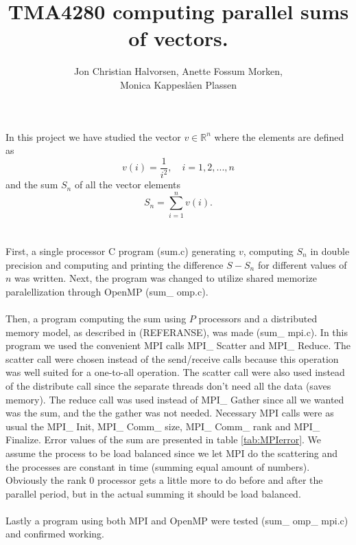 \documentclass{article}
\title{TMA4280 computing parallel sums of vectors.}
\author{Jon Christian Halvorsen, Anette Fossum Morken, \\Monica Kappeslåen Plassen}
\begin{document}
\maketitle
In this project we have studied the vector $v \in \mathbb{R}^n$ where the elements are defined as 
\begin{equation}
\label{vdefinition}
	v(i) =\frac{1}{i^2},\quad i = 1,2,...,n
\end{equation}
and the sum $S_n$ of all the vector elements 
\begin{equation}
\label{Sdefinition}
	S_n = \sum_{i=1}^n v(i).
\end{equation}\\
\\
First, a single processor C program (sum.c) generating $v$, computing $S_n$ in double precision and computing and printing the difference $S - S_n$ for different values of $n$ was written. Next, the program was changed to utilize shared memorize paralellization through OpenMP (sum\_ omp.c). \\
\\
Then, a program computing the sum using $P$ processors and a distributed memory model, as described in (REFERANSE), was made (sum\_ mpi.c). In this program we used the convenient MPI calls MPI\_ Scatter and MPI\_ Reduce. The scatter call were chosen instead of the send/receive calls because this operation was well suited for a one-to-all operation. The scatter call were also used instead of the distribute call since the separate threads don't need all the data (saves memory). The reduce call was used instead of MPI\_ Gather since all we wanted was the sum, and the the gather was not needed. Necessary MPI calls were as usual the MPI\_ Init, MPI\_ Comm\_ size, MPI\_ Comm\_ rank and MPI\_ Finalize. Error values of the sum are presented in table \ref{tab:MPIerror}. We assume the process to be load balanced since we let MPI do the scattering and the processes are constant in time (summing equal amount of numbers). Obviously the rank 0 processor gets a little more to do before and after the parallel period, but in the actual summing it should be load balanced. \\
\\
Lastly a program using both MPI and OpenMP were tested (sum\_ omp\_ mpi.c) and confirmed working.
\end{document}
